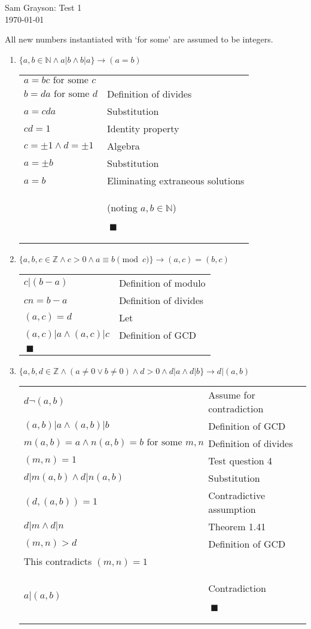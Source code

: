 \documentclass[12pt,letterpaper]{article}
\makeatletter
\newcommand{\fs}{\textrm{~for some~}}
\newenvironment{proof}{
\mbox{}\vspace*{-1.68\baselineskip}
\begin{longtable}[l]{@{} l l}
}{
\tiny {$~\blacksquare$}
\end{longtable}
}
\makeatother
\begin{document}
\singlespacing %

\begin{center}
{\Large Sam Grayson: Test 1} \\
\today
\end{center}

All new numbers instantiated with `for some' are assumed to be integers.

\begin{enumerate}[leftmargin=0cm]

\item 
$\{a, b \in \mathbb{N} \wedge a|b \wedge b|a\} \rightarrow (a = b) $

\begin{proof}
$a = bc \fs c$ \\
$b = da \fs d$ & Definition of divides \\
$a = cda$ & Substitution \\
$cd = 1$ & Identity property \\
$c = \pm 1 \wedge d = \pm 1$ & Algebra \\
$a = \pm b$ & Substitution \\
$a = b$ & Eliminating extraneous solutions \\
& (noting $a, b \in \mathbb{N}$)
\end{proof}

\item 
$\{a, b, c \in \mathbb{Z} \wedge c > 0 \wedge a \equiv b \pmod c\} \rightarrow (a, c) = (b, c) $

\begin{proof}
$c|(b - a)$ & Definition of modulo \\
$cn = b - a$ & Definition of divides \\
$(a, c) = d$ & Let \\
$(a, c)|a \wedge (a, c)|c$ & Definition of GCD \\
\end{proof}

\item 
$\{a, b, d \in \mathbb{Z} \wedge (a \neq 0 \vee b \neq 0) \wedge d > 0 \wedge d|a \wedge d|b\} \rightarrow d|(a, b)$

\begin{proof}
$d \neg (a, b)$ & Assume for contradiction \\
$(a, b)|a \wedge (a, b)|b$ & Definition of GCD \\
$m (a, b) = a \wedge n (a, b) = b \fs m, n$ & Definition of divides \\
$(m, n) = 1$ & Test question 4 \\
$d|m (a, b) \wedge d|n (a, b)$ & Substitution \\
$(d, (a, b)) = 1$ & Contradictive assumption\\
$d|m \wedge d|n$ & Theorem 1.41 \\
$(m, n) > d$ & Definition of GCD \\
This contradicts $(m, n) = 1$ \\
$a | (a, b)$ & Contradiction
\end{proof}


\end{enumerate}
\end{document}
